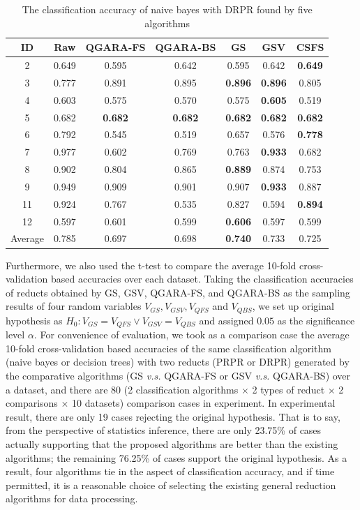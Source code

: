 \documentclass[review]{elsarticle}
\begin{document}
		\begin{table}[htb]
			\centering
			\caption{The classification accuracy of naive bayes with DRPR found by five algorithms}
			\begin{tabular}{ccccccc}
				\hline
				ID    & Raw   & QGARA-FS & QGARA-BS & GS    & GSV   & CSFS \\
				\hline
				2     & 0.649 & 0.595 & 0.642 & 0.595 & 0.642 & \textbf{0.649} \\
				3     & 0.777 & 0.891 & 0.895 & \textbf{0.896} & \textbf{0.896} & 0.805 \\
				4     & 0.603 & 0.575 & 0.570 & 0.575 & \textbf{0.605} & 0.519 \\
				5     & 0.682 & \textbf{0.682} & \textbf{0.682} & \textbf{0.682} & \textbf{0.682} & \textbf{0.682} \\
				6     & 0.792 & 0.545 & 0.519 & 0.657 & 0.576 & \textbf{0.778} \\
				7     & 0.977 & 0.602 & 0.769 & 0.763 & \textbf{0.933} & 0.682 \\
				8     & 0.902 & 0.804 & 0.865 & \textbf{0.889} & 0.874 & 0.753 \\
				9     & 0.949 & 0.909 & 0.901 & 0.907 & \textbf{0.933} & 0.887 \\
				11    & 0.924 & 0.767 & 0.535 & 0.827 & 0.594 & \textbf{0.894} \\
				12    & 0.597 & 0.601 & 0.599 & \textbf{0.606} & 0.597 & 0.599 \\
				\hline
				Average & 0.785 & 0.697 & 0.698 & \textbf{0.740} & 0.733 & 0.725 \\
				\hline
			\end{tabular}%
			\label{canbd}%
		\end{table}%
	\par Furthermore, we also used the t-test to compare the average 10-fold cross-validation based accuracies over each dataset. Taking the classification accuracies of reducts obtained by GS, GSV, QGARA-FS, and QGARA-BS as the sampling results of four random variables $V_{GS}, V_{GSV}, V_{QFS}$ and $ V_{QBS}$, we set up original hypothesis as $H_0: V_{GS}=V_{QFS} \vee V_{GSV}=V_{QBS}$ and assigned $0.05$ as the significance level $\alpha$. For convenience of evaluation, we took as a comparison case the average 10-fold cross-validation based accuracies of the same classification algorithm (naive bayes or decision trees) with two reducts (PRPR or DRPR) generated by the comparative algorithms (GS \emph{v.s.} QGARA-FS or GSV \emph{v.s.} QGARA-BS) over a dataset, and there are 80 (2 classification algorithms $\times$ 2 types of reduct $\times$ 2 comparisons $\times$ 10 datasets) comparison cases in experiment. In experimental result, there are only 19 cases rejecting the original hypothesis. That is to say, from the perspective of statistics inference, there are only 23.75\% of cases actually supporting that the proposed algorithms are better than the existing algorithms; the remaining 76.25\% of cases support the original hypothesis. As a result, four algorithms tie in the aspect of classification accuracy, and if time permitted, it is a reasonable choice of selecting the existing general reduction algorithms for data processing.
\end{document}
